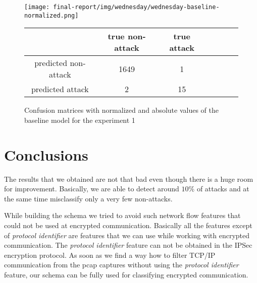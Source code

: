 \documentclass{article}
\begin{document}

\begin{figure}[h!]
    \centering
    \texttt{[image: final-report/img/wednesday/wednesday-baseline-normalized.png]}

    \centering
    \begin{tabular}{ |c|c|c|c|c|c|c| }
     \hline
      & true non-attack & true attack \\
     \hline
     predicted non-attack & 1649 & 1 \\
     \hline
     predicted attack & 2 & 15 \\
     \hline
    \end{tabular}
    \caption{Confusion matrices with normalized and absolute values of the baseline model for the experiment 1}
    \label{fig-exp1-baseline}
\end{figure}





\clearpage
\section{Conclusions}
The results that we obtained are not that bad even though there is a huge room for improvement. Basically, we are able to detect around $10\%$ of attacks and at the same time misclassify only a very few non-attacks.

While building the schema we tried to avoid such network flow features that could not be used at encrypted communication. Basically all the features except of \textit{protocol identifier} are features that we can use while working with encrypted communication. The \textit{protocol identifier} feature can not be obtained in the IPSec encryption protocol. As soon as we find a way how to filter TCP/IP communication from the pcap captures without using the \textit{protocol identifier} feature, our schema can be fully used for classifying encrypted communication.



\clearpage




% 


\end{document}
